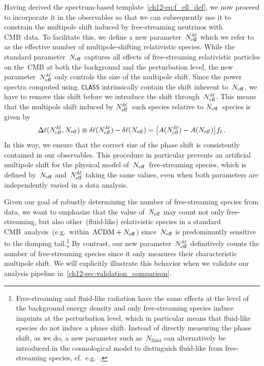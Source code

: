 Having derived the spectrum-based template~\eqref{ch12-eq:f_ell_def}, we now proceed to incorporate it in the observables so that we can subsequently use it to constrain the multipole shift induced by free-streaming neutrinos with CMB~data. To facilitate this, we define a new parameter~$N_\mathrm{eff}^{\delta\ell}$ which we refer to as the effective number of multipole-shifting relativistic species. While the standard parameter~$N_\mathrm{eff}$ captures all effects of free-streaming relativistic particles on the~CMB at both the background and the perturbation level, the new parameter~$N_\mathrm{eff}^{\delta\ell}$ only controls the size of the multipole shift. Since the power spectra computed using~\texttt{CLASS} intrinsically contain the shift inherent to~$N_\mathrm{eff}$, we have to remove this shift before we introduce the shift through~$N_\mathrm{eff}^{\delta\ell}$. This means that the multipole shift induced by $N_\mathrm{eff}^{\delta\ell}$~such species relative to $N_\mathrm{eff}$~species is given by
\begin{equation}
	\Delta\ell(N_\mathrm{eff}^{\delta\ell}, N_\mathrm{eff}) \equiv \delta\ell(N_\mathrm{eff}^{\delta\ell}) - \delta\ell(N_\mathrm{eff}) = \bigl[A(N_\mathrm{eff}^{\delta\ell}) - A(N_\mathrm{eff})\bigr] f_\ell\, .	\label{ch12-eq:deltaellnu}
\end{equation}
In this way, we ensure that the correct size of the phase shift is consistently contained in our observables. This procedure in particular prevents an artificial multipole shift for the physical model of~$N_\mathrm{eff}$~free-streaming species, which is defined by~$N_\mathrm{eff}$ and~$N_\mathrm{eff}^{\delta\ell}$ taking the same values, even when both parameters are independently varied in a data analysis.

Given our goal of robustly determining the number of free-streaming species from data, we want to emphasize that the value of~$N_\mathrm{eff}$ may count not only free-streaming, but also other~(fluid-like) relativistic species in a standard CMB~analysis~(e.g.\ within~$\Lambda\mathrm{CDM} + N_\mathrm{eff}$) since~$N_\mathrm{eff}$ is predominantly sensitive to the damping tail.\footnote{Free-streaming and fluid-like radiation have the same effects at the level of the background energy density and only free-streaming species induce imprints at the perturbation level, which in particular means that fluid-like species do not induce a phase shift. Instead of directly measuring the phase shift, as we do, a new parameter such as~$N_\mathrm{fluid}$ can alternatively be introduced in the cosmological model to distinguish fluid-like from free-streaming species, cf.~e.g.~\cite{Bell:2005dr, Friedland:2007vv, Baumann:2015rya, Brust:2017nmv, Blinov:2020hmc, Brinckmann:2020bcn, Brinckmann:2022ajr}.} By contrast, our new parameter~$N_\mathrm{eff}^{\delta\ell}$ definitively counts the number of free-streaming species since it only measures their characteristic multipole shift. We will explicitly illustrate this behavior when we validate our analysis pipeline in~\textsection\ref{ch12-sec:validation_comparison}.\medskip

